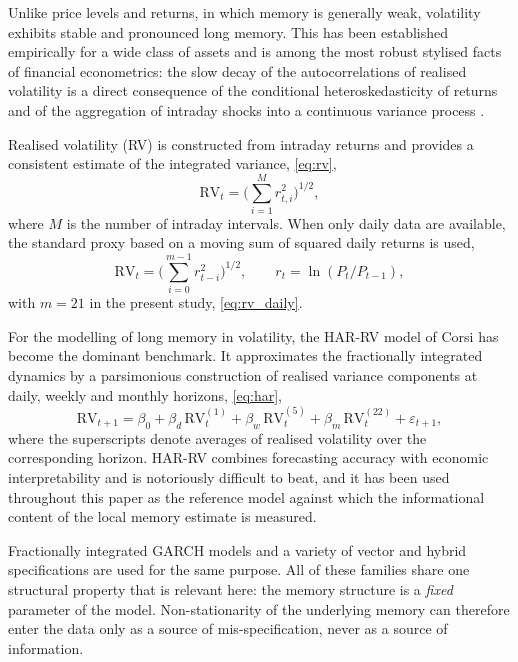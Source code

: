 \documentclass[journal]{IEEEtran}
\begin{document}
Unlike price levels and returns, in which memory is generally weak, volatility exhibits stable
and pronounced long memory. This has been established empirically for a wide class of assets and
is among the most robust stylised facts of financial econometrics: the slow decay of the
autocorrelations of realised volatility is a direct consequence of the conditional heteroskedasticity
of returns and of the aggregation of intraday shocks into a continuous variance process
\cite{andersen2003modeling}.

Realised volatility (RV) is constructed from intraday returns and provides a consistent estimate
of the integrated variance, \eqref{eq:rv},
\begin{equation}\label{eq:rv}
\mathrm{RV}_t=\Big(\sum_{i=1}^{M} r_{t,i}^2\Big)^{1/2},
\end{equation}
where $M$ is the number of intraday intervals. When only daily data are available, the standard
proxy based on a moving sum of squared daily returns is used,
\begin{equation}\label{eq:rv_daily}
\mathrm{RV}_t=\Big(\sum_{i=0}^{m-1} r_{t-i}^2\Big)^{1/2},\qquad
r_t=\ln(P_t/P_{t-1}),
\end{equation}
with $m=21$ in the present study, \eqref{eq:rv_daily}.

For the modelling of long memory in volatility, the HAR-RV model of Corsi \cite{corsi2009simple}
has become the dominant benchmark. It approximates the fractionally integrated dynamics by a
parsimonious construction of realised variance components at daily, weekly and monthly horizons,
\eqref{eq:har},
\begin{equation}\label{eq:har}
\mathrm{RV}_{t+1}=\beta_0+\beta_d\,\mathrm{RV}^{(1)}_t+\beta_w\,\mathrm{RV}^{(5)}_t
+\beta_m\,\mathrm{RV}^{(22)}_t+\varepsilon_{t+1},
\end{equation}
where the superscripts denote averages of realised volatility over the corresponding horizon.
HAR-RV combines forecasting accuracy with economic interpretability and is notoriously difficult
to beat, and it has been used throughout this paper as the reference model against which the
informational content of the local memory estimate is measured.

Fractionally integrated GARCH models \cite{baillie1996fractionally} and a variety of vector and
hybrid specifications are used for the same purpose. All of these families share one structural
property that is relevant here: the memory structure is a \emph{fixed} parameter of the model.
Non-stationarity of the underlying memory can therefore enter the data only as a source of
mis-specification, never as a source of information.
\end{document}
